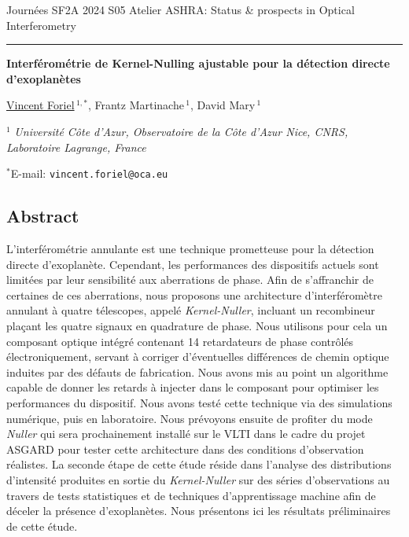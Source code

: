 \documentclass[12pt]{article}
\begin{document}
Journées SF2A 2024
\hfill
S05 Atelier ASHRA: Status \& prospects in Optical Interferometry

\smallskip
\hrule

\bigskip

\begin{center}
\LARGE \bf Interférométrie de Kernel-Nulling ajustable pour la détection directe d’exoplanètes\rm

\vspace{0.5cm}

\large  \underline{Vincent Foriel}$\,^{1,*}$, \large Frantz Martinache$\,^1$, \large David Mary$\,^1$

\vspace{0.5cm}

\normalsize

$^1$ \textit{Université Côte d’Azur, Observatoire de la Côte d’Azur Nice, CNRS, Laboratoire Lagrange, France}

\vspace{0.3cm}
$^*$E-mail: {\tt vincent.foriel@oca.eu}

\end{center}
\vspace{-0.8cm}
\subsection*{\Large Abstract}

L'interférométrie annulante est une technique prometteuse pour la détection directe d'exoplanète. Cependant, les performances des dispositifs actuels sont limitées par leur sensibilité aux aberrations de phase. Afin de s'affranchir de certaines de ces aberrations, nous proposons une architecture d'interféromètre annulant à quatre télescopes, appelé {\it Kernel-Nuller}\cite{Chingaipe et al. 2022}, incluant un recombineur plaçant les quatre signaux en quadrature de phase. Nous utilisons pour cela  un composant optique intégré contenant 14 retardateurs de phase contrôlés électroniquement, servant à corriger d'éventuelles différences de chemin optique induites par des défauts de fabrication. Nous avons mis au point un algorithme capable de donner les retards à injecter dans le composant pour optimiser les performances du dispositif. Nous avons testé cette technique via des simulations numérique, puis en laboratoire. Nous prévoyons ensuite de profiter du mode {\it Nuller} qui sera prochainement installé sur le VLTI dans le cadre du projet ASGARD pour tester cette architecture dans des conditions d'observation réalistes. La seconde étape de cette étude réside dans l'analyse des distributions d'intensité produites en sortie du {\it Kernel-Nuller}\cite{Chingaipe et al. 2022, Cvetojevic et al. 2022} sur des séries d’observations au travers de tests statistiques et de techniques d’apprentissage machine afin de déceler la présence d'exoplanètes. Nous présentons ici les résultats préliminaires de cette étude.
\end{document}
